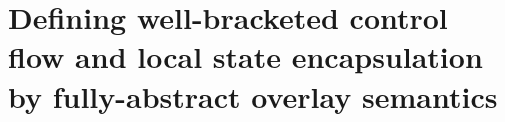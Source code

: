 \documentclass[aspectratio=169]{beamer}
\begin{document}

\section{Defining well-bracketed control flow and local state encapsulation by fully-abstract overlay semantics}
\end{document}

